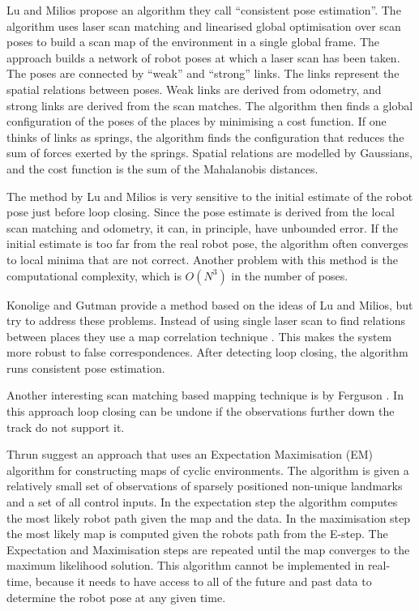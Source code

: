 

Lu and Milios \cite{lu97:_global} propose an algorithm they call
``consistent pose estimation''. The algorithm uses laser scan matching
and linearised global optimisation over scan poses to build a scan map
of the environment in a single global frame. The approach builds a
network of robot poses at which a laser scan has been taken. The poses
are connected by ``weak'' and ``strong'' links. The links represent
the spatial relations between poses. Weak links are derived from
odometry, and strong links are derived from the scan matches. The
algorithm then finds a global configuration of the poses of the places
by minimising a cost function. If one thinks of links as springs, the
algorithm finds the configuration that reduces the sum of forces
exerted by the springs. Spatial relations are modelled by Gaussians,
and the cost function is the sum of the Mahalanobis distances.

The method by Lu and Milios is very sensitive to the initial estimate
of the robot pose just before loop closing. Since the pose estimate is
derived from the local scan matching and odometry, it can, in
principle, have unbounded error. If the initial estimate is too far
from the real robot pose, the algorithm often converges to local
minima that are not correct. Another problem with this method is the
computational complexity, which is $O(N^3)$ in the number of poses.

Konolige and Gutman
\cite{konolige99:_increm_mappin_large_cyclic_envir} provide a method
based on the ideas of Lu and Milios, but try to address these
problems. Instead of using single laser scan to find relations between
places they use a map correlation technique \cite{konolige99}. This
makes the system more robust to false correspondences. After detecting
loop closing, the algorithm runs consistent pose estimation. 

Another interesting scan matching based mapping technique is
\cite{fergusson2003} by Ferguson \etal. In this approach loop closing
can be undone if the observations further down the track do not
support it.

Thrun \etal \cite{slam_thrun98b,Thrun98a,thrun98:_probab} suggest an
approach that uses an Expectation Maximisation (EM) algorithm for
constructing maps of cyclic environments. The algorithm is given a
relatively small set of observations of sparsely positioned non-unique
landmarks and a set of all control inputs. In the expectation step the
algorithm computes the most likely robot path given the map and the
data. In the maximisation step the most likely map is computed given
the robots path from the E-step. The Expectation and Maximisation
steps are repeated until the map converges to the maximum likelihood
solution. This algorithm cannot be implemented in real-time, because
it needs to have access to all of the future and past data to
determine the robot pose at any given time.

